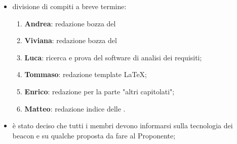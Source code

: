 \documentclass[a4paper,titlepage]{article}
\begin{document}
\begin{itemize}
  \item divisione di compiti a breve termine:
  \begin{enumerate}
  	\item \textbf{Andrea}: redazione bozza del 
  	\item \textbf{Viviana}: redazione bozza del 
  	\item \textbf{Luca}: ricerca e prova del software di analisi dei requisiti;
  	\item \textbf{Tommaso}: redazione template \LaTeX;
  	\item \textbf{Enrico}: redazione  per la parte "altri capitolati";
  	\item \textbf{Matteo}: redazione indice delle .
  \end{enumerate}
  \item è stato deciso che tutti i membri devono informarsi sulla tecnologia dei beacon e su qualche proposta da fare al Proponente;
\end{itemize}
\end{document}
